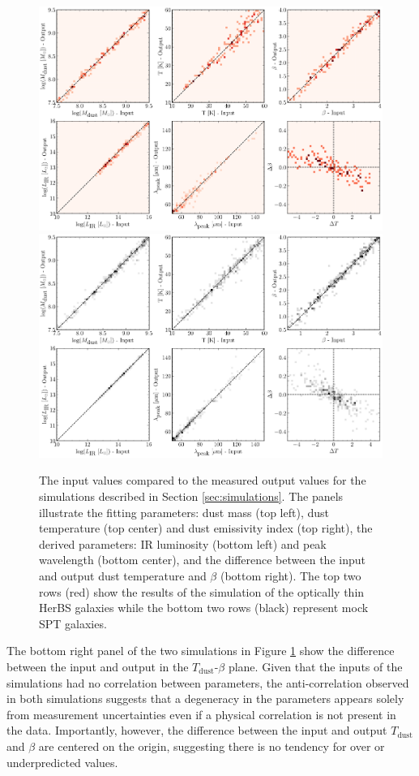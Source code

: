 \begin{figure}
	\centering
	\includegraphics[width=0.75\columnwidth]{Figures/in_out_simulations_herbs_ot_detected.pdf}
	\includegraphics[width=0.75\columnwidth]{Figures/in_out_simulations_spt_ot_detected.pdf}
	\caption[Comparison of the input and output parameter values from simulations]{The input values compared to the measured output values for the simulations described in Section \ref{sec:simulations}. The panels illustrate the fitting parameters: dust mass (top left), dust temperature (top center) and dust emissivity index (top right), the derived parameters: IR luminosity (bottom left) and peak wavelength (bottom center), and the difference between the input and output dust temperature and $\beta$ (bottom right). The top two rows (red) show the results of the simulation of the optically thin HerBS galaxies while the bottom two rows (black) represent mock SPT galaxies.}
	\label{fig:in_out_simulations}
\end{figure}

The bottom right panel of the two simulations in Figure \ref{fig:in_out_simulations} show the difference between the input and output in the $T_{\textrm{dust}}$-$\beta$ plane. Given that the inputs of the simulations had no correlation between parameters, the anti-correlation observed in both simulations suggests that a degeneracy in the parameters appears solely from measurement uncertainties even if a physical correlation is not present in the data. Importantly, however, the difference between the input and output $T_{\textrm{dust}}$ and $\beta$ are centered on the origin, suggesting there is no tendency for over or underpredicted values.

